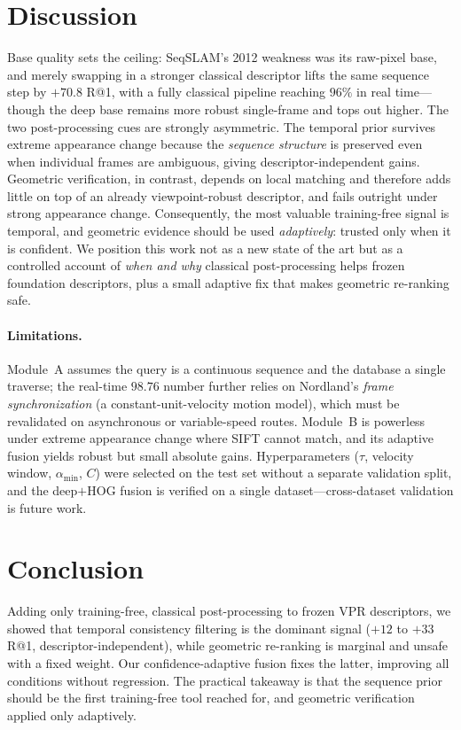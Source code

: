 \documentclass[10pt,twocolumn,letterpaper]{article}
\begin{document}
\section{Discussion}
\label{sec:discussion}
Base quality sets the ceiling: SeqSLAM's 2012 weakness was its raw-pixel base,
and merely swapping in a stronger classical descriptor lifts the same sequence
step by $+70.8$ R@1, with a fully classical pipeline reaching $96\%$ in real
time---though the deep base remains more robust single-frame and tops out higher.
The two post-processing cues are strongly asymmetric. The temporal prior
survives extreme appearance change because the \emph{sequence structure} is
preserved even when individual frames are ambiguous, giving descriptor-independent
gains. Geometric
verification, in contrast, depends on local matching and therefore adds little
on top of an already viewpoint-robust descriptor, and fails outright under
strong appearance change. Consequently, the most valuable training-free signal
is temporal, and geometric evidence should be used \emph{adaptively}: trusted
only when it is confident. We position this work not as a new state of the art
but as a controlled account of \emph{when and why} classical post-processing
helps frozen foundation descriptors, plus a small adaptive fix that makes
geometric re-ranking safe.

\paragraph{Limitations.} Module~A assumes the query is a continuous sequence
and the database a single traverse; the real-time $98.76$ number further relies
on Nordland's \emph{frame synchronization} (a constant-unit-velocity motion
model), which must be revalidated on asynchronous or variable-speed routes.
Module~B is powerless under extreme appearance change where SIFT cannot match,
and its adaptive fusion yields robust but small absolute gains. Hyperparameters
($\tau$, velocity window, $\alpha_{\min}$, $C$) were selected on the test set
without a separate validation split, and the deep${+}$HOG fusion is verified on
a single dataset---cross-dataset validation is future work.

\section{Conclusion}
\label{sec:conclusion}
Adding only training-free, classical post-processing to frozen VPR descriptors,
we showed that temporal consistency filtering is the dominant signal
($+12$ to $+33$ R@1, descriptor-independent), while geometric re-ranking is
marginal and unsafe with a fixed weight. Our confidence-adaptive fusion fixes
the latter, improving all conditions without regression. The practical takeaway
is that the sequence prior should be the first training-free tool reached for,
and geometric verification applied only adaptively.

{\small


}
\end{document}
